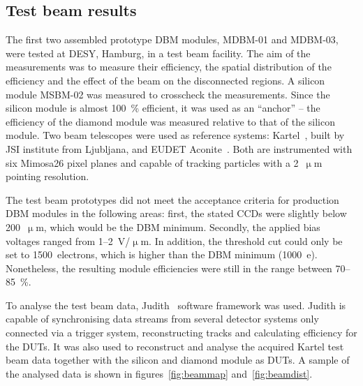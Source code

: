 \subsection{Test beam results}
The first two assembled prototype DBM modules, MDBM-01 and MDBM-03, were tested at DESY, Hamburg, in a test beam facility. The aim of the measurements was to measure their efficiency, the spatial distribution of the efficiency and the effect of the beam on the disconnected regions. A silicon module MSBM-02 was measured to crosscheck the measurements. Since the silicon module is almost 100~\% efficient, it was used as an ``anchor'' -- the efficiency of the diamond module was measured relative to that of the silicon module. Two beam telescopes were used as reference systems: Kartel~\cite{}, built by JSI institute from Ljubljana, and EUDET Aconite~\cite{}. Both are instrumented with six Mimosa26 pixel planes and capable of tracking particles with a 2~$\upmu$m pointing resolution.

The test beam prototypes did not meet the acceptance criteria for production DBM modules in the following areas: first, the stated CCDs were slightly below 200~$\upmu$m, which would be the DBM minimum. Secondly, the applied bias voltages ranged from 1--2~V/$\upmu$m. In addition, the threshold cut could only be set to 1500~electrons, which is higher than the DBM minimum (1000~e). Nonetheless, the resulting module efficiencies were still in the range between 70--85~\%.

To analyse the test beam data, Judith~\cite{} software framework was used. Judith is capable of synchronising data streams from several detector systems only connected via a trigger system, reconstructing tracks and calculating efficiency for the DUTs. It was also used to reconstruct and analyse the acquired Kartel test beam data together with the silicon and diamond module as DUTs. A sample of the analysed data is shown in figures~\ref{fig:beammap} and~\ref{fig:beamdist}. 


